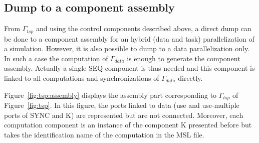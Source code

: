 \subsection{Dump to a component assembly}
From $\Gamma_{tsp}$ and using the control components described above,
a direct dump can be done to a component assembly for an hybrid (data
and task) parallelization of a simulation. However, it is also
possible to dump to a data parallelization only. In such a case the
computation of $\Gamma_{data}$ is enough to generate the component
assembly. Actually a single SEQ component is thus needed and this
component is linked to all computations and synchronizations of
$\Gamma_{data}$ directly.

Figure~\ref{fig:tsp:assembly} displays the assembly part corresponding to
$\Gamma_{tsp}$ of Figure~\ref{fig:tsp}. In this figure, the ports
linked to data (use and use-multiple ports of SYNC and K) are
represented but are not connected. Moreover, each computation
component is an instance of the component K presented before but takes
the identification name of the computation in the MSL file.

